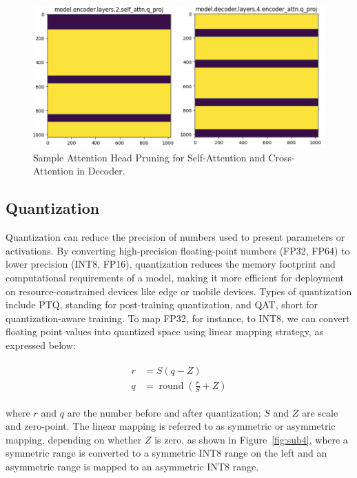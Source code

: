 \begin{figure}[h!]
    \centering
    \includegraphics[width=0.9\linewidth]{images/pruning2}
    \caption{Sample Attention Head Pruning for Self-Attention and Cross-Attention in Decoder.}
    \label{fig:attention_head_pruning}
\end{figure}


\subsection{Quantization}
Quantization can reduce the precision of numbers used to present parameters or activations. By converting high-precision floating-point numbers (FP32, FP64) to lower precision (INT8, FP16), quantization reduces the memory footprint and computational requirements of a model, making it more efficient for deployment on resource-constrained devices like edge or mobile devices. Types of quantization include PTQ, standing for post-training quantization, and QAT, short for quantization-aware training. To map FP32, for instance, to INT8, we can convert floating point values into quantized space using linear mapping strategy, as expressed below:


\begin{gather}
\begin{split}
    r &= S(q-Z) \\
    q &= \operatorname{round}\left(\frac{r}{S} + Z\right)
\end{split}
\end{gather}

where $r$ and $q$ are the number before and after quantization; $S$ and $Z$ are scale and zero-point.
The linear mapping is referred to as symmetric or asymmetric mapping, depending on whether $Z$ is zero,
as shown in Figure~\ref{fig:sub4}, where a symmetric range is converted to a symmetric INT8 range on the left and an asymmetric range is mapped to an asymmetric INT8 range.

